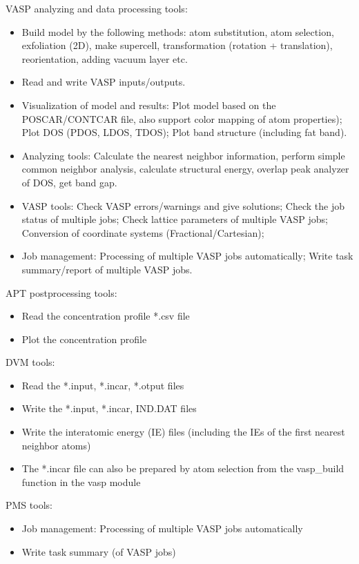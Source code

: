 \documentclass[12pt]{book}
\begin{document}
VASP analyzing and data processing tools:
\begin{itemize}
\item Build model by the following methods: atom substitution, atom selection, exfoliation (2D), make supercell, transformation (rotation + translation), reorientation, adding vacuum layer etc.
\item Read and write VASP inputs/outputs.
\item Visualization of model and results: Plot model based on the POSCAR/CONTCAR file, also support color mapping of atom properties); Plot DOS (PDOS, LDOS, TDOS); Plot band structure (including fat band).
\item Analyzing tools: Calculate the nearest neighbor information, perform simple common neighbor analysis, calculate structural energy, overlap peak analyzer of DOS, get band gap.
\item VASP tools: Check VASP errors/warnings and give solutions; Check the job status of multiple jobs; Check lattice parameters of multiple VASP jobs; Conversion of coordinate systems (Fractional/Cartesian);
\item Job management: Processing of multiple VASP jobs automatically; Write task summary/report of multiple VASP jobs.
\end{itemize}

APT postprocessing tools:
\begin{itemize}
\item Read the concentration profile *.csv file
\item Plot the concentration profile
\end{itemize}

DVM tools:
\begin{itemize}
\item Read the *.input, *.incar, *.otput files
\item Write the *.input, *.incar, IND.DAT files
\item Write the interatomic energy (IE) files (including the IEs of the first nearest neighbor atoms)
\item The *.incar file can also be prepared by atom selection from the vasp\_build function in the vasp module 
\end{itemize}

PMS tools:
\begin{itemize}
\item Job management: Processing of multiple VASP jobs automatically
\item Write task summary (of VASP jobs)
\end{itemize}
\end{document}
